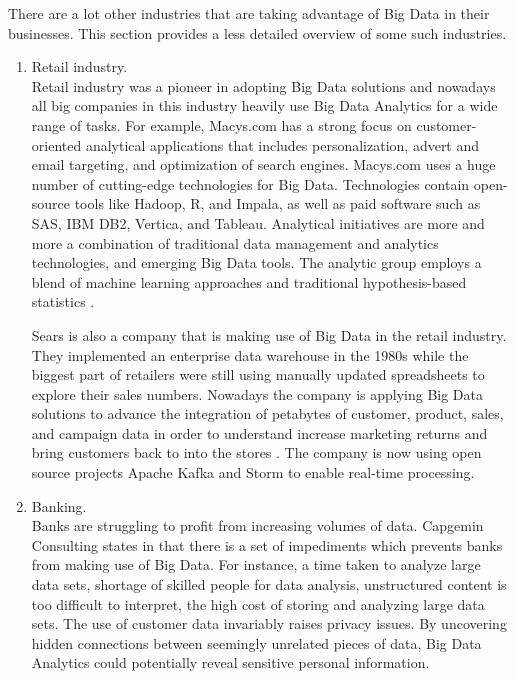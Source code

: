 \documentclass[runningheads]{llncs}
\begin{document}
There are a lot other industries that are taking advantage of Big Data in their businesses. This section provides a less detailed overview of some such industries.

\begin{enumerate}
\item Retail industry.\\

Retail industry was a pioneer in adopting Big Data solutions and nowadays all big companies in this industry heavily use Big Data Analytics for a wide range of tasks. For example, Macys.com has a strong focus on customer-oriented analytical applications that includes personalization, advert and email targeting, and optimization of search engines. Macys.com uses a huge number of cutting-edge technologies for Big Data. Technologies contain open-source tools like Hadoop, R, and Impala, as well as paid software such as SAS, IBM DB2, Vertica, and Tableau. Analytical initiatives are more and more a combination of traditional data management and analytics technologies, and emerging Big Data tools. The analytic group employs a blend of machine learning approaches and traditional hypothesis-based statistics \cite{DAVENPORT}.

Sears is also a company that is making use of Big Data in the retail industry. They implemented an enterprise data warehouse in the 1980s while the biggest part of retailers were still using manually updated spreadsheets to explore their sales numbers. Nowadays the company is applying Big Data solutions to advance the integration of petabytes of customer, product, sales, and campaign data in order to understand increase marketing returns and bring customers back to into the stores \cite{DAVENPORT}. The company is now using open source projects Apache Kafka and Storm to enable real-time processing.\\

\item Banking.\\

Banks are struggling to profit from increasing volumes of data. Capgemin Consulting states in \cite{} that there is a set of impediments which prevents banks from making use of Big Data. For instance, a time taken to analyze large data sets, shortage of skilled people for data analysis, unstructured content is too difficult to interpret, the high cost of storing and analyzing large data sets.  The use of customer data invariably raises privacy issues. By uncovering
hidden connections between seemingly unrelated pieces of data, Big Data Analytics could potentially reveal sensitive
personal information\cite{CAP}. 


\end{enumerate}
\end{document}
